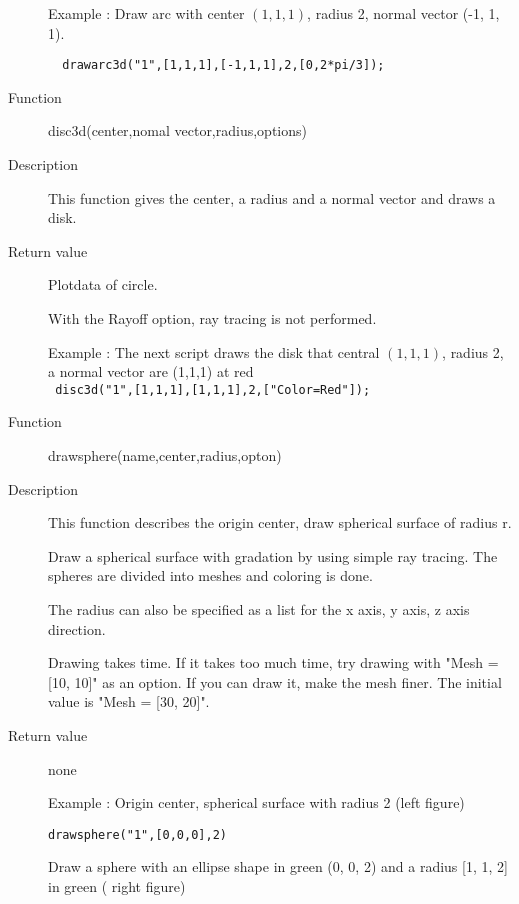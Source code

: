 \documentclass[papersize,a4paper,12pt]{article}
\begin{document}
\begin{description}
 Example : Draw arc with center $ (1,1,1) $, radius 2, normal vector (-1, 1, 1).
  
\verb|  drawarc3d("1",[1,1,1],[-1,1,1],2,[0,2*pi/3]); |


\hypertarget{disc3d}{}
\item[Function] disc3d(center,nomal vector,radius,options)
\item[Description] This function gives the center, a radius and a normal vector and draws a disk. 
\item[Return value] Plotdata of circle.

With the Rayoff option, ray tracing is not performed.

 Example : The next script draws the disk that central $(1,1,1)$, radius 2, a normal vector are (1,1,1) at red\\ 
 
 \verb| disc3d("1",[1,1,1],[1,1,1],2,["Color=Red"]); |


\hypertarget{drawsphere}{}
\item[Function] drawsphere(name,center,radius,opton)
\item[Description] This function describes the origin center, draw spherical surface of radius r.

Draw a spherical surface with gradation by using simple ray tracing. The spheres are divided into meshes and coloring is done.

The radius can also be specified as a list for the x axis, y axis, z axis direction.

Drawing takes time. If it takes too much time, try drawing with "Mesh = [10, 10]" as an option. If you can draw it, make the mesh finer. The initial value is "Mesh = [30, 20]".

\item[Return value] none

\vspace{\baselineskip}
Example : Origin center, spherical surface with radius 2 (left figure)

\verb|drawsphere("1",[0,0,0],2) |

Draw a sphere with an ellipse shape in green (0, 0, 2) and a radius [1, 1, 2] in green ( right figure)


\end{description}
\end{document}
